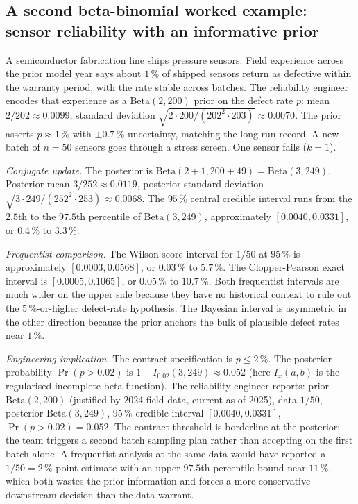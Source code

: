 \subsection{A second beta-binomial worked example: sensor
reliability with an informative prior}

A semiconductor fabrication line ships pressure sensors. Field
experience across the prior model year says about $1 \,\%$ of
shipped sensors return as defective within the warranty period,
with the rate stable across batches. The reliability engineer
encodes that experience as a $\text{Beta}(2, 200)$ prior on the
defect rate $p$: mean $2/202 \approx 0.0099$, standard deviation
$\sqrt{2 \cdot 200/(202^{2} \cdot 203)} \approx 0.0070$. The prior
asserts $p \approx 1 \,\%$ with $\pm 0.7 \,\%$ uncertainty,
matching the long-run record. A new batch of $n = 50$ sensors goes
through a stress screen. One sensor fails ($k = 1$).

\textit{Conjugate update.} The posterior is $\text{Beta}(2 + 1,
200 + 49) = \text{Beta}(3, 249)$. Posterior mean $3/252 \approx
0.0119$, posterior standard deviation
$\sqrt{3 \cdot 249/(252^{2} \cdot 253)} \approx 0.0068$. The $95
\,\%$ central credible interval runs from the $2.5$th to the
$97.5$th percentile of $\text{Beta}(3, 249)$, approximately
$[0.0040, 0.0331]$, or $0.4 \,\%$ to $3.3 \,\%$.

\textit{Frequentist comparison.} The Wilson score interval for
$1/50$ at $95 \,\%$ is approximately $[0.0003, 0.0568]$, or
$0.03 \,\%$ to $5.7 \,\%$. The Clopper-Pearson exact interval is
$[0.0005, 0.1065]$, or $0.05 \,\%$ to $10.7 \,\%$. Both
frequentist intervals are much wider on the upper side because
they have no historical context to rule out the $5 \,\%$-or-higher
defect-rate hypothesis. The Bayesian interval is asymmetric in the
other direction because the prior anchors the bulk of plausible
defect rates near $1 \,\%$.

\textit{Engineering implication.} The contract specification is
$p \leq 2 \,\%$. The posterior probability $\Pr(p > 0.02)$ is
$1 - I_{0.02}(3, 249) \approx 0.052$ (here $I_{x}(a, b)$ is the
regularised incomplete beta function). The reliability engineer
reports: prior $\text{Beta}(2, 200)$ (justified by 2024 field
data, current as of 2025), data $1/50$, posterior $\text{Beta}(3,
249)$, $95 \,\%$ credible interval $[0.0040, 0.0331]$, $\Pr(p >
0.02) = 0.052$. The contract threshold is borderline at the
posterior; the team triggers a second batch sampling plan rather
than accepting on the first batch alone. A frequentist analysis
at the same data would have reported a $1/50 = 2 \,\%$ point
estimate with an upper $97.5$th-percentile bound near $11 \,\%$,
which both wastes the prior information and forces a more
conservative downstream decision than the data warrant.

